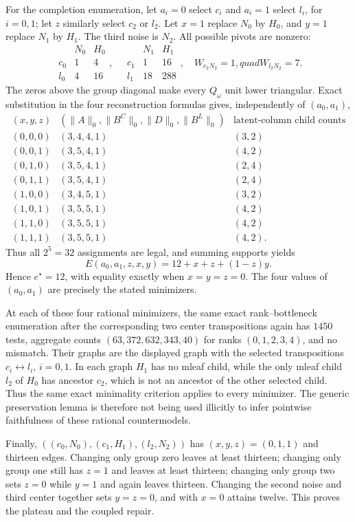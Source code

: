 For the completion enumeration, let \(a_i=0\) select \(c_i\) and \(a_i=1\) select \(l_i\), for \(i=0,1\); let \(z\) similarly select \(c_2\) or \(l_2\). Let \(x=1\) replace \(N_0\) by \(H_0\), and \(y=1\) replace \(N_1\) by \(H_1\). The third noise is \(N_2\). All possible pivots are nonzero:
\[
\begin{array}{c|cc}&N_0&H_0\\ \hline c_0&1&4\\l_0&4&16\end{array},
\quad
\begin{array}{c|cc}&N_1&H_1\\ \hline c_1&1&16\\l_1&18&288\end{array},
\quad W_{c_2N_2}=1,quad W_{l_2N_2}=7.
\]
The zeros above the group diagonal make every \(Q_\omega\) unit lower triangular. Exact substitution in the four reconstruction formulas gives, independently of \((a_0,a_1)\),
\[
\begin{array}{c|c|c}
(x,y,z)&(\|A\|_0,\|B^C\|_0,\|D\|_0,\|B^L\|_0)&\text{latent-column child counts}\\ \hline
(0,0,0)&(3,4,4,1)&(3,2)\\
(0,0,1)&(3,5,4,1)&(4,2)\\
(0,1,0)&(3,5,4,1)&(2,4)\\
(0,1,1)&(3,5,4,1)&(2,4)\\
(1,0,0)&(3,4,5,1)&(3,2)\\
(1,0,1)&(3,5,5,1)&(4,2)\\
(1,1,0)&(3,5,5,1)&(4,2)\\
(1,1,1)&(3,5,5,1)&(4,2).
\end{array}
\]
Thus all \(2^5=32\) assignments are legal, and summing supports yields
\[
E(a_0,a_1,z,x,y)=12+x+z+(1-z)y.
\]
Hence \(e^\star=12\), with equality exactly when \(x=y=z=0\). The four values of \((a_0,a_1)\) are precisely the stated minimizers.

At each of these four rational minimizers, the same exact rank--bottleneck enumeration after the corresponding two center transpositions again has \(1450\) tests, aggregate counts \((63,372,632,343,40)\) for ranks \((0,1,2,3,4)\), and no mismatch. Their graphs are the displayed graph with the selected transpositions \(c_i\leftrightarrow l_i\), \(i=0,1\). In each graph \(H_1\) has no mleaf child, while the only mleaf child \(l_2\) of \(H_0\) has ancestor \(c_2\), which is not an ancestor of the other selected child. Thus the same exact minimality criterion applies to every minimizer. The generic preservation lemma is therefore not being used illicitly to infer pointwise faithfulness of these rational countermodels.

Finally, \(((c_0,N_0),(c_1,H_1),(l_2,N_2))\) has \((x,y,z)=(0,1,1)\) and thirteen edges. Changing only group zero leaves at least thirteen; changing only group one still has \(z=1\) and leaves at least thirteen; changing only group two sets \(z=0\) while \(y=1\) and again leaves thirteen. Changing the second noise and third center together sets \(y=z=0\), and with \(x=0\) attains twelve. This proves the plateau and the coupled repair.
